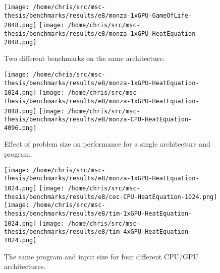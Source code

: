 
\begin{figure}
\texttt{[image: /home/chris/src/msc-thesis/benchmarks/results/e8/monza-1xGPU-GameOfLife-2048.png]}
\texttt{[image: /home/chris/src/msc-thesis/benchmarks/results/e8/monza-1xGPU-HeatEquation-2048.png]}
\caption{%
  Two different benchmarks on the same architecture.%
}
\end{figure}

\begin{figure}
\texttt{[image: /home/chris/src/msc-thesis/benchmarks/results/e8/monza-1xGPU-HeatEquation-1024.png]}
\texttt{[image: /home/chris/src/msc-thesis/benchmarks/results/e8/monza-1xGPU-HeatEquation-2048.png]}
\texttt{[image: /home/chris/src/msc-thesis/benchmarks/results/e8/monza-CPU-HeatEquation-4096.png]}
\caption{%
  Effect of problem size on performance for a single architecture and program.%
}
\end{figure}

\begin{figure}
\texttt{[image: /home/chris/src/msc-thesis/benchmarks/results/e8/monza-1xGPU-HeatEquation-1024.png]}
\texttt{[image: /home/chris/src/msc-thesis/benchmarks/results/e8/cec-CPU-HeatEquation-1024.png]}
\texttt{[image: /home/chris/src/msc-thesis/benchmarks/results/e8/tim-1xGPU-HeatEquation-1024.png]}
\texttt{[image: /home/chris/src/msc-thesis/benchmarks/results/e8/tim-4xGPU-HeatEquation-1024.png]}
\caption{%
  The same program and input size for four different CPU/GPU architectures.%
}
\end{figure}


